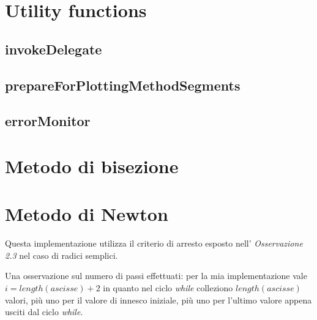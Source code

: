 \section{Utility functions}
\subsection{invokeDelegate}


\subsection{prepareForPlottingMethodSegments}


\subsection{errorMonitor}


\section{Metodo di bisezione}
\label{sec:bisectionIterativeMethod}


\section{Metodo di Newton}
\label{sec:newtonIterativeMethod}
Questa implementazione utilizza il criterio di arresto esposto nell'
\emph{Osservazione 2.3} nel caso di radici semplici.

Una osservazione sul numero di passi effettuati: per la mia implementazione
vale $i = length(ascisse) + 2$ in quanto nel ciclo \emph{while} colleziono
$length(ascisse)$ valori, pi\`u uno per il valore di innesco iniziale, pi\`u uno
per l'ultimo valore appena usciti dal ciclo \emph{while}.


